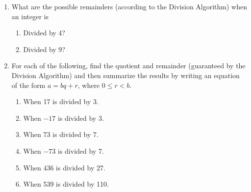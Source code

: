\begin{prog}\label{pr:usingdivalgo} \hfill 
\begin{enumerate}

\item What are the possible remainders (according to the Division Algorithm) when an integer is
\begin{multicols}{2}
\begin{enumerate}
\item Divided by 4?
\item Divided by 9?
\end{enumerate}
\end{multicols}

\item For each of the following, find the quotient and remainder (guaranteed by the Division Algorithm) and then summarize the results by writing an equation of the form $a = bq + r$, where 
$0 \leq r < b$.

\begin{multicols}{2}
\begin{enumerate}
\item When 17 is divided by 3.
\item When $-17$ is divided by 3.
\item When 73 is divided by 7.
\item When $-73$ is divided by 7.
\item When 436 is divided by 27.
\item When 539 is divided by 110.
\end{enumerate}
\end{multicols}
\end{enumerate}
\end{prog}
\hbreak

\endinput
